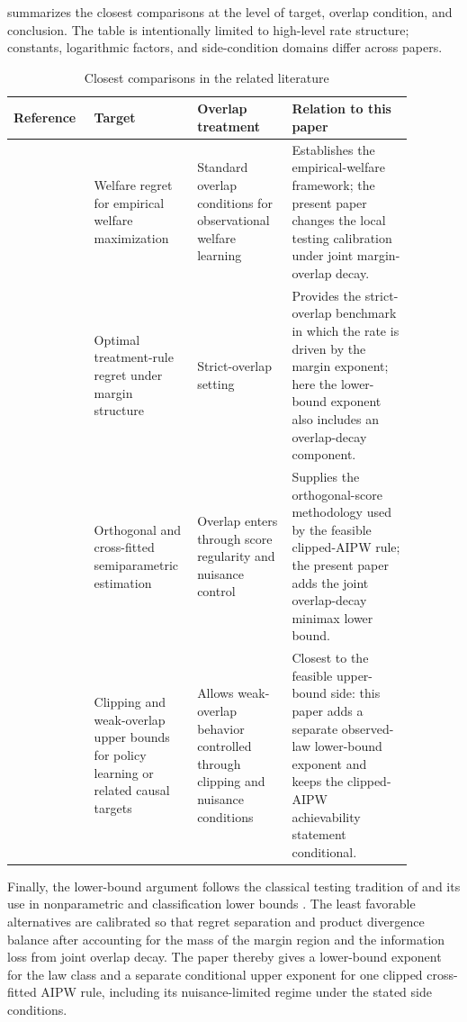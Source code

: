 summarizes the closest comparisons at the level of target, overlap condition, and conclusion.  The table is intentionally limited to high-level rate structure; constants, logarithmic factors, and side-condition domains differ across papers.

\begin{table}[t]
\centering
\caption{Closest comparisons in the related literature}
\label{tab:related-comparison}
\begin{tabular}{p{0.18\linewidth}p{0.20\linewidth}p{0.22\linewidth}p{0.28\linewidth}}
\hline
Reference & Target & Overlap treatment & Relation to this paper \\
\hline
\citet{Kitagawa2018} & Welfare regret for empirical welfare maximization & Standard overlap conditions for observational welfare learning & Establishes the empirical-welfare framework; the present paper changes the local testing calibration under joint margin-overlap decay. \\
\citet{Luedtke2017} & Optimal treatment-rule regret under margin structure & Strict-overlap setting & Provides the strict-overlap benchmark in which the rate is driven by the margin exponent; here the lower-bound exponent also includes an overlap-decay component. \\
\citet{Chernozhukov2018,Chernozhukov2022} & Orthogonal and cross-fitted semiparametric estimation & Overlap enters through score regularity and nuisance control & Supplies the orthogonal-score methodology used by the feasible clipped-AIPW rule; the present paper adds the joint overlap-decay minimax lower bound. \\
\citet{Liu2026} & Clipping and weak-overlap upper bounds for policy learning or related causal targets & Allows weak-overlap behavior controlled through clipping and nuisance conditions & Closest to the feasible upper-bound side: this paper adds a separate observed-law lower-bound exponent and keeps the clipped-AIPW achievability statement conditional. \\
\hline
\end{tabular}
\end{table}

Finally, the lower-bound argument follows the classical testing tradition of \citet{LeCam1986} and its use in nonparametric and classification lower bounds \citep{Tsybakov2009}.  The least favorable alternatives are calibrated so that regret separation and product divergence balance after accounting for the mass of the margin region and the information loss from joint overlap decay.  The paper thereby gives a lower-bound exponent for the law class and a separate conditional upper exponent for one clipped cross-fitted AIPW rule, including its nuisance-limited regime under the stated side conditions.
